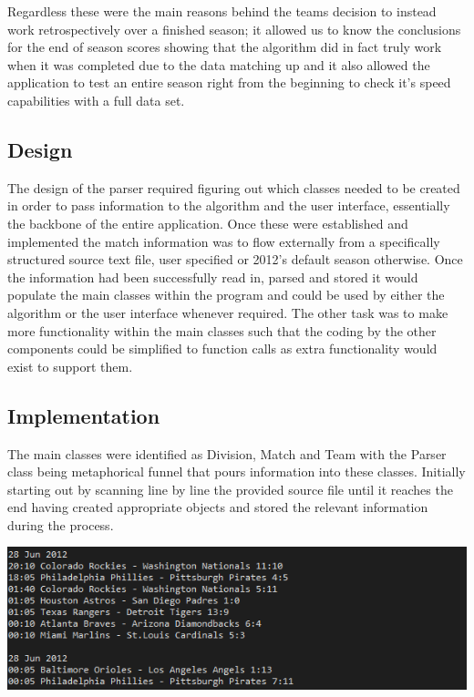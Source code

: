 Regardless these were the main reasons behind the teams decision to instead work
retrospectively over a finished season; it allowed us to know the conclusions
for the end of season scores showing that the algorithm did in fact truly work
when it was completed due to the data matching up and it also allowed the
application to test an entire season right from the beginning to check it's
speed capabilities with a full data set.

\subsection{Design}

The design of the parser required figuring out which classes needed to be
created in order to pass information to the algorithm and the user interface,
essentially the backbone of the entire application. Once these were established
and implemented the match information was to flow externally from a specifically
structured source text file, user specified or 2012's default season otherwise.
Once the information had been successfully read in, parsed and stored it would
populate the main classes within the program and could be used by either the
algorithm or the user interface whenever required. The other task was to make
more functionality within the main classes such that the coding by the other
components could be simplified to function calls as extra functionality would
exist to support them.

\subsection{Implementation}

The main classes were identified as Division, Match and Team with the Parser
class being metaphorical funnel that pours information into these classes.
Initially starting out by scanning line by line the provided source file until
it reaches the end having created appropriate objects and stored the relevant
information during the process.

\includegraphics[width=\linewidth,keepaspectratio]{images/sourceFileExample.png}

